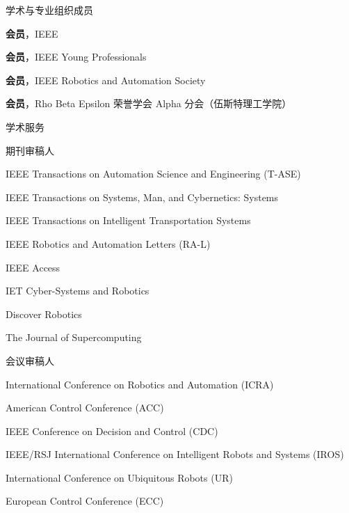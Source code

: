 \documentclass{resume}
\begin{document}
\begin{lSection}{学术与专业组织成员}
\item {\bf 会员}，IEEE
\item {\bf 会员}，IEEE Young Professionals
\item {\bf 会员}，IEEE Robotics and Automation Society
\item {\bf 会员}，Rho Beta Epsilon 荣誉学会 Alpha 分会（伍斯特理工学院）
\end{lSection}

\begin{rSection}{学术服务}

\begin{lSubsection}{期刊审稿人}
\item IEEE Transactions on Automation Science and Engineering (T-ASE)
\item IEEE Transactions on Systems, Man, and Cybernetics: Systems
\item IEEE Transactions on Intelligent Transportation Systems
\item IEEE Robotics and Automation Letters (RA-L)
\item IEEE Access
\item IET Cyber-Systems and Robotics
\item Discover Robotics
\item The Journal of Supercomputing
\end{lSubsection}

\begin{lSubsection}{会议审稿人}
\item International Conference on Robotics and Automation (ICRA)
\item American Control Conference (ACC)
\item IEEE Conference on Decision and Control (CDC)
\item IEEE/RSJ International Conference on Intelligent Robots and Systems (IROS)
\item International Conference on Ubiquitous Robots (UR)
\item European Control Conference (ECC)
\end{lSubsection}

\end{rSection}
\end{document}
